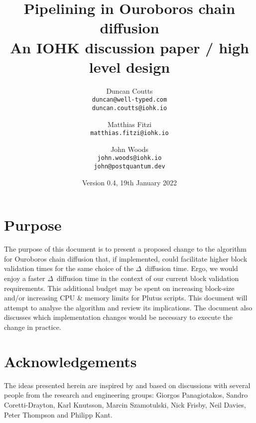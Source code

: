 \documentclass[11pt,a4paper]{article}
\begin{document}
\title {Pipelining in Ouroboros chain diffusion\\
       {\large \sc An IOHK discussion paper / high level design}}
\date  {Version 0.4, 19th January 2022}
\author{Duncan Coutts      \\ {\small \texttt{duncan@well-typed.com}} \\
                              {\small \texttt{duncan.coutts@iohk.io}} \\
   \and Matthias Fitzi     \\ {\small \texttt{matthias.fitzi@iohk.io}} \\
   \and John Woods         \\ {\small \texttt{john.woods@iohk.io}} \\
                              {\small \texttt{john@postquantum.dev}} \\
}

\maketitle

\section{Purpose}
The purpose of this document is to present a proposed change to the algorithm
for Ouroboros chain diffusion that, if implemented, could facilitate higher block validation times
for the same choice of the $\Delta$~diffusion time.
Ergo, we would enjoy a faster $\Delta$~diffusion time in the context of our current block validation requirements.
This additional budget may be spent on increasing block-size and/or increasing CPU \& memory limits for Plutus scripts.
This document will attempt to analyse the algorithm and review its implications. The document also discusses which 
implementation changes would be necessary to execute the change in practice.

\pagebreak

\tableofcontents

\pagebreak

\section{Acknowledgements}
The ideas presented herein are inspired by and based on discussions with several
people from the research and engineering groups: Giorgos Panagiotakos,
Sandro Coretti-Drayton, Karl Knutsson, Marcin Szamotulski, Nick Frisby,
Neil Davies, Peter Thompson and Philipp Kant.
\end{document}
